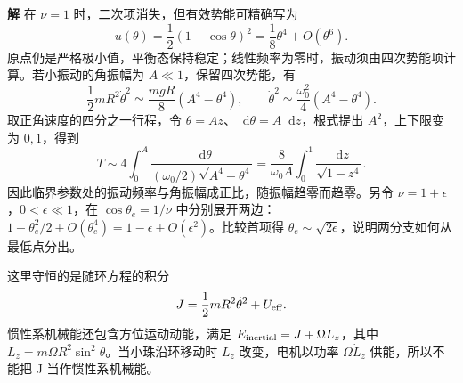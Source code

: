 \documentclass[11pt,openany,fontset=fandol]{ctexbook}
\theoremstyle{definition}\newtheorem{example}{例}[chapter]\newtheorem{exercise}{习题}[chapter]
\newcommand{\SolutionStart}{\par\medskip\ifdim\pagetotal>0pt\ifdim\dimexpr\pagegoal-\pagetotal\relax<3\baselineskip\newpage\fi\fi\noindent\textbf{解}\quad\ignorespaces}
\newenvironment{solution}{\SolutionStart}{\par\medskip}
\newcommand{\dd}{\mathop{}\!\mathrm d}\newcommand{\ee}{\mathrm e}\newcommand{\vct}[1]{\bm{#1}}
\begin{document}
\begin{solution}
在 $\nu=1$ 时，二次项消失，但有效势能可精确写为
\[
u(\theta)=\frac12(1-\cos\theta)^2
=\frac18\theta^4+O(\theta^6).
\]
原点仍是严格极小值，平衡态保持稳定；线性频率为零时，振动须由四次势能项计算。若小振动的角振幅为 $A\ll1$，保留四次势能，有
\[
\frac12mR^2\dot\theta^2\simeq\frac{mgR}{8}(A^4-\theta^4),
\qquad
\dot\theta^2\simeq\frac{\omega_0^2}{4}(A^4-\theta^4).
\]
取正角速度的四分之一行程，令 $\theta=Az$、$\dd\theta=A\dd z$，根式提出 $A^2$，上下限变为 $0,1$，得到
\[
T\sim4\int_0^A\frac{\dd\theta}{(\omega_0/2)\sqrt{A^4-\theta^4}}
=\frac8{\omega_0A}\int_0^1\frac{\dd z}{\sqrt{1-z^4}}.
\]
因此临界参数处的振动频率与角振幅成正比，随振幅趋零而趋零。另令 $\nu=1+\epsilon$，$0<\epsilon\ll1$，在 $\cos\theta_e=1/\nu$ 中分别展开两边：$1-\theta_e^2/2+O(\theta_e^4)=1-\epsilon+O(\epsilon^2)$。比较首项得 $\theta_e\sim\sqrt{2\epsilon}$，说明两分支如何从最低点分出。

这里守恒的是随环方程的积分
\[
J=\frac12mR^2\dot\theta^2+U_{\rm eff}.
\]
惯性系机械能还包含方位运动动能，满足 $E_{\rm inertial}=J+\Omega L_z$，其中 $L_z=m\Omega R^2\sin^2\theta$。当小珠沿环移动时 $L_z$ 改变，电机以功率 $\Omega\dot L_z$ 供能，所以不能把 J 当作惯性系机械能。
\end{solution}
\end{document}
